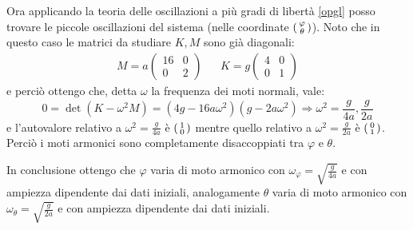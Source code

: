 \documentclass[../main.tex]{subfiles}
\begin{document}
Ora applicando la teoria delle oscillazioni a più gradi di libertà \cref{opgl} posso trovare le piccole oscillazioni del sistema (nelle coordinate $\begin{psmallmatrix}\varphi \\ \theta\end{psmallmatrix}$).
Noto che in questo caso le matrici da studiare $K,M$ sono già diagonali:
\begin{align*}
	M=a\begin{pmatrix}
		16 & 0 \\
		0  & 2
	\end{pmatrix}
	& &
	K=g\begin{pmatrix}
		4 & 0 \\
		0 & 1
	\end{pmatrix}
\end{align*}
e perciò ottengo che, detta $\omega$ la frequenza dei moti normali, vale:
\begin{equation*}
	0=\det \left ( K-\omega^2M \right )=(4g-16a\omega^2)(g-2a\omega^2) \Rightarrow \omega^2=\frac g{4a},\frac g{2a}
\end{equation*}
e l'autovalore relativo a $\omega^2=\frac g{4a}$ è $\begin{psmallmatrix}1 \\ 0\end{psmallmatrix}$ mentre quello relativo a $\omega^2=\frac g{2a}$ è $\begin{psmallmatrix}0 \\ 1\end{psmallmatrix}$. Perciò i moti armonici sono completamente disaccoppiati tra $\varphi$ e $\theta$.

In conclusione ottengo che $\varphi$ varia di moto armonico con $\omega_\varphi=\sqrt{\frac g{4a}}$ e con ampiezza dipendente dai dati iniziali, analogamente $\theta$ varia di moto armonico con $\omega_\theta=\sqrt{\frac g{2a}}$ e con ampiezza dipendente dai dati iniziali.
\end{document}
